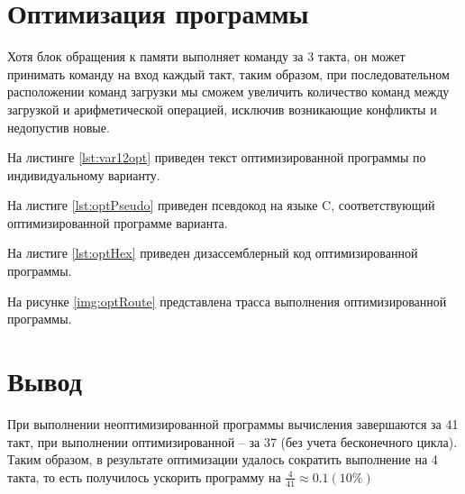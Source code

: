 \section{Оптимизация программы}

Хотя блок обращения к памяти выполняет команду за 3 такта, он может принимать
команду на вход каждый такт, таким образом, при последовательном расположении
команд загрузки мы сможем увеличить количество команд между загрузкой и
арифметической операцией, исключив возникающие конфликты и недопустив новые.

На листинге \ref{lst:var12opt} приведен текст оптимизированной программы по
индивидуальному варианту.


На листиге \ref{lst:optPseudo} приведен псевдокод на языке C, соответствующий
оптимизированной программе варианта.


На листиге \ref{lst:optHex} приведен дизассемблерный код оптимизированной
программы.


На рисунке \ref{img:optRoute} представлена трасса выполнения оптимизированной
программы.


\section{Вывод}

При выполнении неоптимизированной программы вычисления завершаются за 41
такт, при выполнении оптимизированной -- за 37 (без учета бесконечного цикла).
Таким образом, в результате оптимизации удалось сократить выполнение на 4
такта, то есть получилось ускорить программу на
$\frac{4}{41} \approx 0.1 (10\%)$

